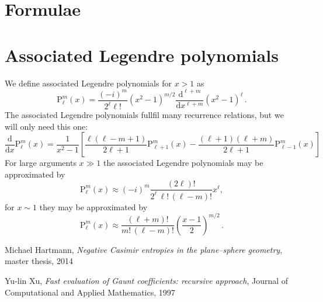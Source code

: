 \documentclass[superscriptaddress,prb]{revtex4-1}
\newcommand{\imag}{i} %
\newcommand{\Plm}[2]{{\text{P}_{#1}^{#2}}}
\begin{document}
\appendix

\section{Formulae}


\section{Associated Legendre polynomials}

We define associated Legendre polynomials for $x>1$ as
\begin{equation}
\Plm{\ell}{m}(x) = \frac{(-\imag)^m}{2^\ell \ell!} \left(x^2-1\right)^{m/2} \frac{\mathrm{d}^{\ell+m}}{\mathrm{d}x^{\ell+m}} \left(x^2-1\right)^\ell \,.
\end{equation}
The associated Legendre polynomials fullfil many recurrence relations, but we will only need this one:
\begin{equation}
\label{appendix:dPlm}
\frac{\mathrm{d}}{\mathrm{d}x} \Plm{\ell}{m}(x) = \frac{1}{x^2-1} \left[
\frac{\ell(\ell-m+1)}{2\ell+1} \Plm{\ell+1}{m}(x)
-\frac{(\ell+1)(\ell+m)}{2\ell+1} \Plm{\ell-1}{m}(x)
\right]
\end{equation}
For large arguments $x\gg 1$ the associated Legendre polynomials may be approximated by
\begin{equation}
\label{appendix:Plm_gg}
\Plm{\ell}{m}(x) \approx (-\imag)^m \frac{(2\ell)!}{2^\ell \, \ell! \, (\ell-m)!} x^\ell,
\end{equation}
for $x\sim1$ they may be approximated by
\begin{equation}
\label{appendix:Plm_1}
\Plm{\ell}{m}(x) \approx \frac{(\ell+m)!}{m! \, (\ell-m)!} \left(\frac{x-1}{2}\right)^{m/2} \,.
\end{equation}



\begin{thebibliography}{99}

  Michael Hartmann,
  \emph{Negative Casimir entropies in the plane–sphere geometry}, master thesis, 2014

  Yu-lin Xu,
  \emph{Fast evaluation of Gaunt coefficients: recursive approach}, Journal of Computational and Applied Mathematics, 1997

\end{thebibliography}
\end{document}
